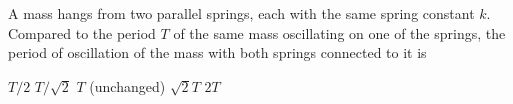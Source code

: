 \documentclass{../../oss-apphys-exam}
\begin{document}
\begin{multicols*}{2}
\begin{questions}
    
    \columnbreak
    
    \question A mass hangs from two parallel springs, each with the same spring
    constant $k$. Compared to the period $T$ of the same mass oscillating on
    one of the springs, the period of oscillation of the mass with both
    springs connected to it is
    \begin{choices}
      \choice $T/2$
      \choice $T/\sqrt2$
      \choice $T$ (unchanged)
      \choice $\sqrt2T$
      \choice $2T$
    \end{choices}


\end{questions}
\end{multicols*}
\end{document}
